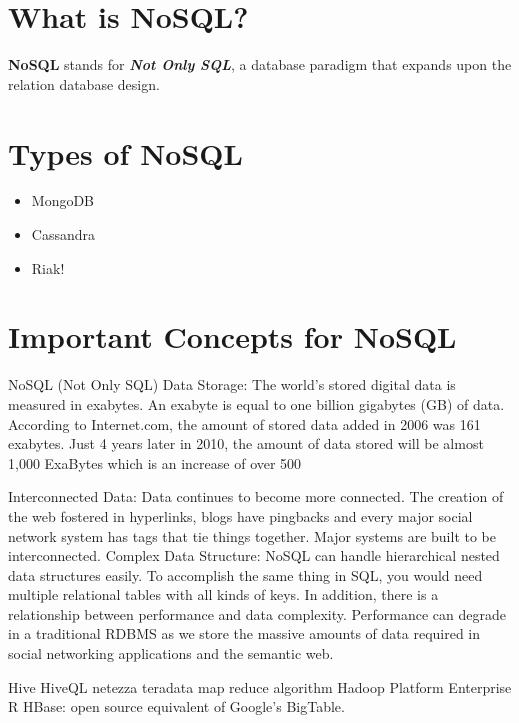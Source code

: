 \section{What is NoSQL?}
\textbf{NoSQL} stands for \textbf{\textit{Not Only SQL}}, a database paradigm that expands upon the relation database design.

\section{Types of NoSQL}
\begin{itemize}
\item MongoDB
\item Cassandra
\item Riak!
\end{itemize}
\newpage
\section{Important Concepts for NoSQL}

NoSQL (Not Only SQL)
Data Storage: The world's stored digital data is measured in exabytes. An exabyte is equal to one billion gigabytes (GB) of data. According to Internet.com, the amount of stored data added in 2006 was 161 exabytes. Just 4 years later in 2010, the amount of data stored will be almost 1,000 ExaBytes which is an increase of over 500%

Interconnected Data: Data continues to become more connected. The creation of the web fostered in hyperlinks, blogs have pingbacks and every major social network system has tags that tie things together. Major systems are built to be interconnected.
Complex Data Structure: NoSQL can handle hierarchical nested data structures easily. To accomplish the same thing in SQL, you would need multiple relational tables with all kinds of keys. In addition, there is a relationship between performance and data complexity. Performance can degrade in a traditional RDBMS as we store the massive amounts of data required in social networking applications and the semantic web.








Hive HiveQL
netezza
teradata
map reduce algorithm
Hadoop Platform
Enterprise R
HBase: open source equivalent of Google's BigTable.  



